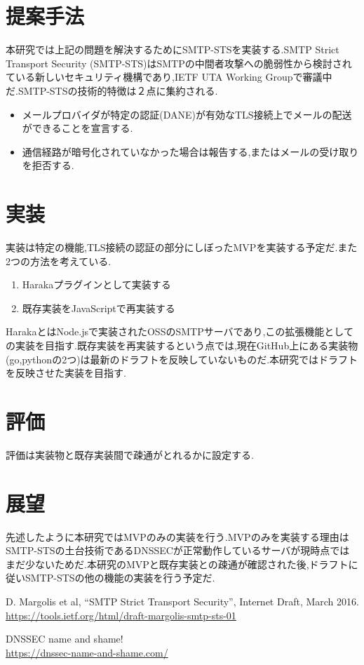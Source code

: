 \documentclass[a4j,10pt]{jsarticle}
\begin{document}
\section{提案手法}

本研究では上記の問題を解決するためにSMTP-STSを実装する.SMTP Strict Transport Security (SMTP-STS)はSMTPの中間者攻撃への脆弱性から検討されている新しいセキュリティ機構であり,IETF UTA Working Groupで審議中だ.\cite{draft}SMTP-STSの技術的特徴は２点に集約される.

\begin{itemize}
\item メールプロバイダが特定の認証(DANE)が有効なTLS接続上でメールの配送ができることを宣言する.
\item 通信経路が暗号化されていなかった場合は報告する,またはメールの受け取りを拒否する.
\end{itemize}

\section{実装}

実装は特定の機能,TLS接続の認証の部分にしぼったMVPを実装する予定だ.また2つの方法を考えている.

\begin{enumerate}
\item Harakaプラグインとして実装する
\item 既存実装をJavaScriptで再実装する
\end{enumerate}

HarakaとはNode.jsで実装されたOSSのSMTPサーバであり,この拡張機能としての実装を目指す.既存実装を再実装するという点では,現在GitHub上にある実装物(go,pythonの2つ)は最新のドラフトを反映していないものだ.本研究ではドラフトを反映させた実装を目指す.

\section{評価}

評価は実装物と既存実装間で疎通がとれるかに設定する.

\section{展望}

先述したように本研究ではMVPのみの実装を行う.MVPのみを実装する理由はSMTP-STSの土台技術であるDNSSECが正常動作しているサーバが現時点ではまだ少ないためだ.\cite{dnssec}本研究のMVPと既存実装との疎通が確認された後,ドラフトに従いSMTP-STSの他の機能の実装を行う予定だ.

\begin{thebibliography}{9}
D. Margolis et al, “SMTP Strict Transport Security”, Internet Draft, March 2016.\\
\url{https://tools.ietf.org/html/draft-margolis-smtp-sts-01}

DNSSEC name and shame!\\
\url{ https://dnssec-name-and-shame.com/}
\end{thebibliography}
\end{document}
